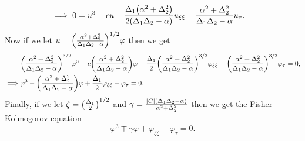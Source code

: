 \documentclass[12pt]{report}
\begin{document}
\begin{solution}
\begin{align*}
        \implies 0 &= u^3 - cu + \frac{\Delta_1{\left(\alpha^2 + \Delta_2^2\right)}}{2{\left(\Delta_1 \Delta_2 - \alpha\right)}} u_{\xi \xi} - \frac{\alpha^2 + \Delta_2^2}{\Delta_1\Delta_2 -\alpha}u_\tau. 
    \end{align*}
    Now if we let $u = {\left(\frac{\alpha^2 + \Delta_2^2}{\Delta_1 \Delta_2 - \alpha}\right)}^{1/2}\varphi$ then we get
    \begin{align*}
        &{\left(\frac{\alpha^2 + \Delta_2^2}{\Delta_1 \Delta_2 - \alpha}\right)}^{3/2}\varphi^3 - c {\left(\frac{\alpha^2 + \Delta_2^2}{\Delta_1 \Delta_2 - \alpha}\right)}\varphi + \frac{\Delta_1}{2}{\left(\frac{\alpha^2 + \Delta_2^2}{\Delta_1 \Delta_2 - \alpha}\right)}^{3/2}\varphi_{\xi \xi} - {\left(\frac{\alpha^2 + \Delta_2^2}{\Delta_1 \Delta_2 - \alpha}\right)}^{3/2}\varphi_\tau = 0,\\
        \implies &\varphi^3 - {\left(\frac{\alpha^2 + \Delta_2^2}{\Delta_1 \Delta_2 - \alpha}\right)}\varphi + \frac{\Delta_1}{2}\varphi_{\xi \xi} - \varphi_\tau = 0.
    \end{align*}
    Finally, if we let $\zeta = {\left(\frac{\Delta_1}{2}\right)}^{1/2}$ and $\gamma = \frac{|C|{\left(\Delta_1 \Delta_2 - \alpha\right)}}{\alpha^2 + \Delta_2^2}$ then we get the Fisher-Kolmogorov equation
    \[ 
        \varphi^3 \mp \gamma \varphi + \varphi_{\xi \xi} - \varphi_{\tau} = 0.
    \]
\end{solution}

\newpage
\end{document}
